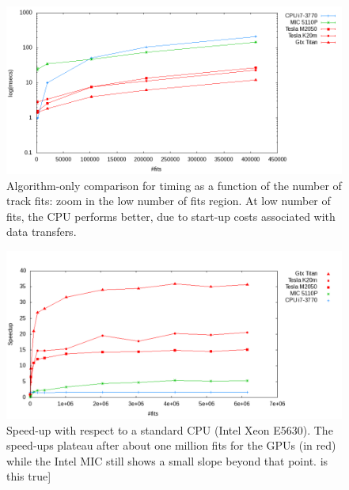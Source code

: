 \documentclass[letterpaper]{jpconf}
\providecommand{\fixme}[1]{\xspace{\sffamily{[\bfseries{}FIXME:} #1]}}
\begin{document}
  \begin{figure}[!tbp]
    \centering
    \includegraphics[width=0.9\linewidth]{figures/TimeCompZoom_MIC.png} 
    \caption{Algorithm-only comparison for timing as a function of the
      number of track fits: zoom in the low number of fits region. At
      low number of fits, the CPU performs better, due to start-up
      costs associated with data transfers.}
    \label{fig:algo_only_timing_zoom}
  \end{figure}
 
 \begin{figure}[!tbp]
   \centering
   \includegraphics[width=0.9\linewidth]{figures/Speedup_MIC}
   \caption{Speed-up with respect to a standard CPU (Intel Xeon
     E5630). The speed-ups plateau after about one million fits for
     the GPUs (in red) while the Intel MIC still shows a small slope
     beyond that point. \fixme{is this true}}
   \label{fig:algo_only_speedup}
 \end{figure}
\end{document}
